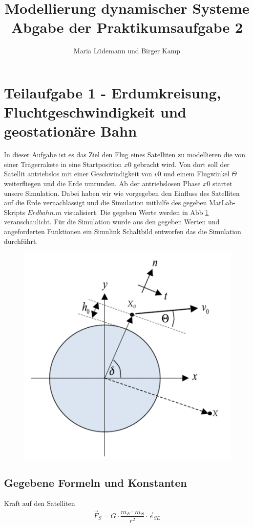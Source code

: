 \documentclass[]{scrartcl}
\title{Modellierung dynamischer Systeme  \\ Abgabe der Praktikumsaufgabe 2}
\author{Maria Lüdemann und Birger Kamp}
\begin{document}
\maketitle
{}
\tableofcontents
\newpage


\section{Teilaufgabe 1 - Erdumkreisung, Fluchtgeschwindigkeit und geostationäre Bahn}
In dieser Aufgabe ist es das Ziel den Flug eines Satelliten zu modellieren die von einer Trägerrakete in eine Startposition $x0$ gebracht wird. Von dort soll der Satellit antriebslos mit einer Geschwindigkeit von $v0$ und einem Flugwinkel $\Theta$ weiterfliegen und die Erde umrunden. Ab der antriebslosen Phase $x0$ startet unsere Simulation. Dabei haben wir wie vorgegeben den Einfluss des Satelliten auf die Erde vernachlässigt und die Simulation mithilfe des gegeben MatLab-Skripts $Erdbahn.m$ visualisiert. Die gegeben Werte werden in Abb \ref{fig:1_BezeichnerDiagramm} veranschaulicht. Für die Simulation wurde aus den gegeben Werten und angeforderten Funktionen ein Simulink Schaltbild entworfen das die Simulation durchführt. 

\begin{figure}[H]
\centering
\includegraphics[width=0.5\linewidth]{./1_BezeichnerDiagramm}
\caption{}
\label{fig:1_BezeichnerDiagramm}
\end{figure}

\subsection{Gegebene Formeln und Konstanten}
Kraft auf den Satelliten
\begin{align}
\vec{F}_{S} = G \cdot \dfrac{m_{E} \cdot m_{S}}{r^2} \cdot \vec{e}_{SE}
\end{align}
\end{document}
